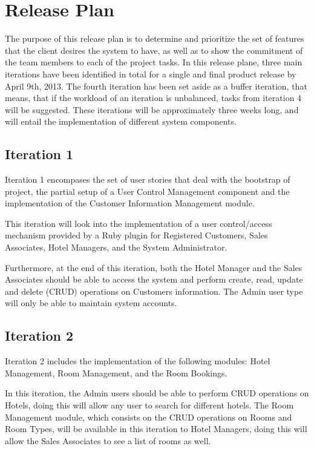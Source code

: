 \section{Release Plan}

The purpose of this release plan is to determine and prioritize the set of features that the client desires the system to have, as well as to show the commitment of the team members to each of the project tasks. In this release plane, three main iterations have been identified in total for a single and final product release by April 9th, 2013. The fourth iteration has been set aside as a buffer iteration, that means, that if the workload of an iteration is unbalanced, tasks from iteration 4 will be suggested. These iterations will be approximately three weeks long, and will entail the implementation of different system components.

\subsection{Iteration 1}
Iteration 1 encompases the set of user stories that deal with the bootstrap of project, the partial setup of a User Control Management component and the implementation of the Customer Information Management module.

This iteration will look into the implementation of a user control/access mechanism provided by a Ruby plugin for Registered Customers, Sales Associates, Hotel Managers, and the System Administrator.

Furthermore, at the end of this iteration, both the Hotel Manager and the Sales Associates should be able to access the system and perform create, read, update and delete (CRUD) operations on Customers information. The Admin user type will only be able to maintain system accounts.

\subsection{Iteration 2}
Iteration 2 includes the implementation of the following modules: Hotel Management, Room Management, and the Room Bookings.

In this iteration, the Admin users should be able to perform CRUD operations on Hotels, doing this will allow any user to search for different hotels. The Room Management module, which consists on the CRUD operations on Rooms and Room Types, will be available in this iteration to Hotel Managers, doing this will allow the Sales Associates to see a list of rooms as well.


